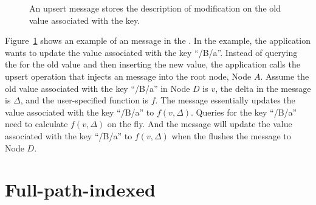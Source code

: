 \begin{figure}[t]
    \centering
    
    \caption[An example of an upsert in a \bet]{\label{fig:upsert}
        An upsert message stores the description of modification on the old
        value associated with the key.}
\end{figure}

Figure~\ref{fig:upsert} shows an example of an \upsertm message in the \bet.
In the example, the application wants to update the value associated with
the key ``/B/a''.
Instead of querying the \bet for the old value and then inserting the new value,
the application calls the upsert operation that injects an \upsertm message into
the root node, Node $A$.
Assume the old value associated with the key ``/B/a'' in Node $D$ is $v$,
the delta in the \upsertm message is $\Delta$,
and the user-specified function is $f$.
The \upsertm message essentially updates the value associated with the key
``/B/a'' to $f(v,\Delta)$.
Queries for the key ``/B/a'' need to calculate $f(v,\Delta)$ on the fly.
And the \upsertm message will update the value associated with the key ``/B/a''
to $f(v,\Delta)$ when the \bet flushes the message to Node $D$.

\section{Full-path-indexed \betrfs}
\label{sec:bg:fpi}

